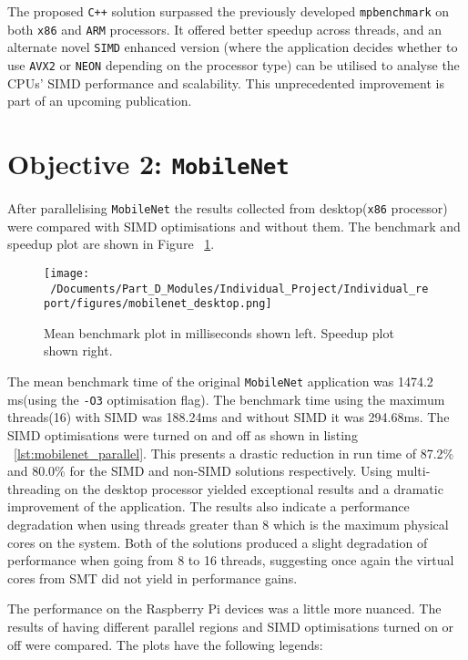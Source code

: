 The proposed \texttt{C++} solution surpassed the previously developed \texttt{mpbenchmark}\cite{mpbenchmark_paper} on both \texttt{x86} and \texttt{ARM} processors. It offered better speedup across threads, and an alternate novel \texttt{SIMD} enhanced version (where the application decides whether to use \texttt{AVX2} or \texttt{NEON} depending on the processor type) can be utilised to analyse the CPUs' SIMD performance and scalability. This unprecedented improvement is part of an upcoming publication.

\section{Objective 2: \texttt{MobileNet}}
After parallelising \texttt{MobileNet} the results collected from desktop(\texttt{x86} processor) were compared with SIMD optimisations and without them. The benchmark and speedup plot are shown in Figure ~\ref{fig:mobilenet_desktop_plot}.

\begin{figure}[htbp] %
	\centering
	\texttt{[image: ~/Documents/Part\_D\_Modules/Individual\_Project/Individual\_report/figures/mobilenet\_desktop.png]} %
	\caption{Mean benchmark plot in milliseconds shown left. Speedup plot shown right.}
	\label{fig:mobilenet_desktop_plot} %
\end{figure}

The mean benchmark time of the original \texttt{MobileNet} application\cite{mobilenet_repo} was 1474.2 ms(using the \texttt{-O3} optimisation flag). The benchmark time using the maximum threads(16) with SIMD was 188.24ms and without SIMD it was 294.68ms. The SIMD optimisations were turned on and off as shown in listing  ~\ref{lst:mobilenet_parallel}. This presents a drastic reduction in run time of 87.2\% and 80.0\% for the SIMD and non-SIMD solutions respectively. Using multi-threading on the desktop processor yielded exceptional results and a dramatic improvement of the application. The results also indicate a performance degradation when using threads greater than 8 which is the maximum physical cores on the system. Both of the solutions produced a slight degradation of performance when going from 8 to 16 threads, suggesting once again the virtual cores from SMT did not yield in performance gains. 

The performance on the Raspberry Pi devices was a little more nuanced. The results of having different parallel regions and SIMD optimisations turned on or off were compared. The plots have the following legends:

